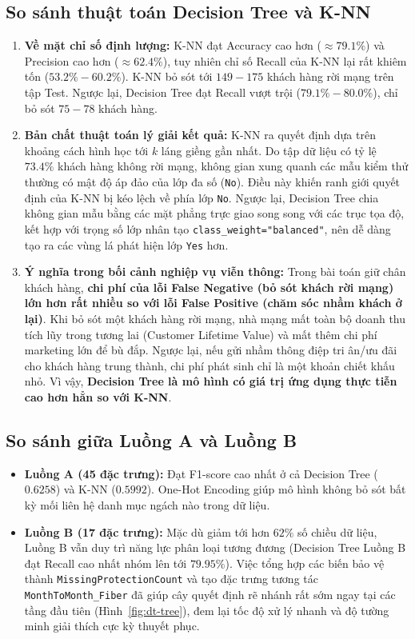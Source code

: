 \documentclass[12pt,a4paper]{article}
\begin{document}
\subsection{So sánh thuật toán Decision Tree và K-NN}
\begin{enumerate}
    \item \textbf{Về mặt chỉ số định lượng:} K-NN đạt Accuracy cao hơn ($\approx 79.1\%$) và Precision cao hơn ($\approx 62.4\%$), tuy nhiên chỉ số Recall của K-NN lại rất khiêm tốn ($53.2\% - 60.2\%$). K-NN bỏ sót tới $149 - 175$ khách hàng rời mạng trên tập Test. Ngược lại, Decision Tree đạt Recall vượt trội ($79.1\% - 80.0\%$), chỉ bỏ sót $75 - 78$ khách hàng.
    \item \textbf{Bản chất thuật toán lý giải kết quả:} K-NN ra quyết định dựa trên khoảng cách hình học tới $k$ láng giềng gần nhất. Do tập dữ liệu có tỷ lệ $73.4\%$ khách hàng không rời mạng, không gian xung quanh các mẫu kiểm thử thường có mật độ áp đảo của lớp đa số (\texttt{No}). Điều này khiến ranh giới quyết định của K-NN bị kéo lệch về phía lớp \texttt{No}. Ngược lại, Decision Tree chia không gian mẫu bằng các mặt phẳng trực giao song song với các trục tọa độ, kết hợp với trọng số lớp nhân tạo \texttt{class\_weight="balanced"}, nên dễ dàng tạo ra các vùng lá phát hiện lớp \texttt{Yes} hơn.
    \item \textbf{Ý nghĩa trong bối cảnh nghiệp vụ viễn thông:} Trong bài toán giữ chân khách hàng, \textbf{chi phí của lỗi False Negative (bỏ sót khách rời mạng) lớn hơn rất nhiều so với lỗi False Positive (chăm sóc nhầm khách ở lại)}. Khi bỏ sót một khách hàng rời mạng, nhà mạng mất toàn bộ doanh thu tích lũy trong tương lai (Customer Lifetime Value) và mất thêm chi phí marketing lớn để bù đắp. Ngược lại, nếu gửi nhầm thông điệp tri ân/ưu đãi cho khách hàng trung thành, chi phí phát sinh chỉ là một khoản chiết khấu nhỏ. Vì vậy, \textbf{Decision Tree là mô hình có giá trị ứng dụng thực tiễn cao hơn hẳn so với K-NN}.
\end{enumerate}

\subsection{So sánh giữa Luồng A và Luồng B}
\begin{itemize}
    \item \textbf{Luồng A (45 đặc trưng):} Đạt F1-score cao nhất ở cả Decision Tree ($0.6258$) và K-NN ($0.5992$). One-Hot Encoding giúp mô hình không bỏ sót bất kỳ mối liên hệ danh mục ngách nào trong dữ liệu.
    \item \textbf{Luồng B (17 đặc trưng):} Mặc dù giảm tới hơn $62\%$ số chiều dữ liệu, Luồng B vẫn duy trì năng lực phân loại tương đương (Decision Tree Luồng B đạt Recall cao nhất nhóm lên tới $79.95\%$). Việc tổng hợp các biến bảo vệ thành \texttt{MissingProtectionCount} và tạo đặc trưng tương tác \texttt{MonthToMonth\_Fiber} đã giúp cây quyết định rẽ nhánh rất sớm ngay tại các tầng đầu tiên (Hình~\ref{fig:dt-tree}), đem lại tốc độ xử lý nhanh và độ tường minh giải thích cực kỳ thuyết phục.
\end{itemize}
\end{document}
